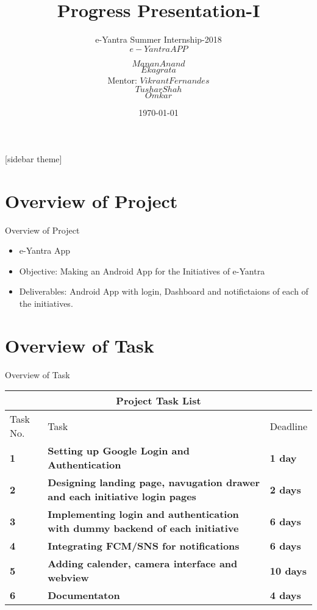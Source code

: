 \documentclass[10pt, a4paper]{beamer}
\begin{document}
	\title{Progress Presentation-I}
	\subtitle{e-Yantra Summer Internship-2018 \\ $e-Yantra APP$}
	\author{$Manan Anand$\\$Ekagrata$\\
	Mentor: $Vikrant Fernandes$\\$Tushar Shah$\\$Omkar$}
	\date{\today}
	
	\frame{\titlepage}

[sidebar theme]
\section{Overview of Project}
\begin{frame}{Overview of Project}
	
	\begin{itemize}
		\item e-Yantra App
		\item Objective: Making an Android App for the Initiatives of e-Yantra 
		\item Deliverables: Android App with login, Dashboard and notifictaions of each of the initiatives.
	\end{itemize}
\end{frame}

\section{Overview of Task}
\begin{frame}{Overview of Task}
		



\begin{center}

\begin{tabular}{ |p{1cm}||p{6.8cm}|p{1.3cm}| }
 \hline
 \multicolumn{3}{|c|}{Project Task List} \\
 \hline
 Task No. & \centering Task & Deadline\\
 \hline
 \textbf{1}& \textbf{Setting up Google Login and Authentication}  & \textbf{1 day}\\
 \hline
 \textbf{2}&   \textbf{Designing landing page, navugation drawer and each initiative login pages} & \textbf{2 days} \\
 \hline
 \textbf{3} & \textbf{Implementing login and authentication with dummy backend of each initiative} & \textbf{6 days}\\
 \hline
 \textbf{4} & \textbf{Integrating FCM/SNS for notifications} & \textbf{6 days}\\
 \hline
\textbf{ 5} &  \textbf{Adding calender, camera interface and webview}  & \textbf{10 days}\\
 \hline
\textbf{ 6} & \textbf{Documentaton}  & \textbf{ 4 days}  \\

 \hline
\end{tabular}
 
\end{center}

\end{frame}
\end{document}
